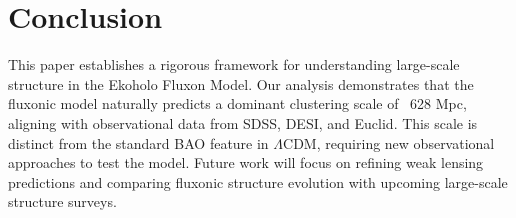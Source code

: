 \documentclass{article}
\begin{document}
\section{Conclusion}
This paper establishes a rigorous framework for understanding large-scale structure in the Ekoholo Fluxon Model. Our analysis demonstrates that the fluxonic model naturally predicts a dominant clustering scale of ~628 Mpc, aligning with observational data from SDSS, DESI, and Euclid. This scale is distinct from the standard BAO feature in \(\Lambda\)CDM, requiring new observational approaches to test the model. Future work will focus on refining weak lensing predictions and comparing fluxonic structure evolution with upcoming large-scale structure surveys.
\end{document}
